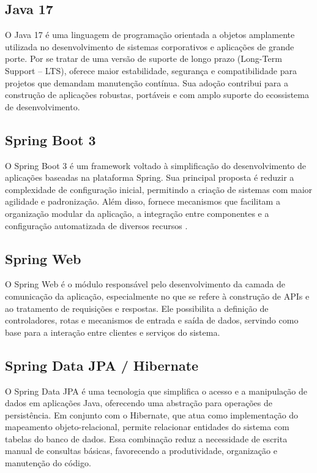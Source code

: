 \subsection{Java 17}
O Java 17 é uma linguagem de programação orientada a objetos amplamente utilizada no desenvolvimento de sistemas corporativos e aplicações de grande porte. Por se tratar de uma versão de suporte de longo prazo (Long-Term Support – LTS), oferece maior estabilidade, segurança e compatibilidade para projetos que demandam manutenção contínua. Sua adoção contribui para a construção de aplicações robustas, portáveis e com amplo suporte do ecossistema de desenvolvimento.

\subsection{Spring Boot 3}
O Spring Boot 3 é um framework voltado à simplificação do desenvolvimento de aplicações baseadas na plataforma Spring. Sua principal proposta é reduzir a complexidade de configuração inicial, permitindo a criação de sistemas com maior agilidade e padronização. Além disso, fornece mecanismos que facilitam a organização modular da aplicação, a integração entre componentes e a configuração automatizada de diversos recursos \cite{springboot2026}.

\subsection{Spring Web}
O Spring Web é o módulo responsável pelo desenvolvimento da camada de comunicação da aplicação, especialmente no que se refere à construção de APIs e ao tratamento de requisições e respostas. Ele possibilita a definição de controladores, rotas e mecanismos de entrada e saída de dados, servindo como base para a interação entre clientes e serviços do sistema.

\subsection{Spring Data JPA / Hibernate}
O Spring Data JPA é uma tecnologia que simplifica o acesso e a manipulação de dados em aplicações Java, oferecendo uma abstração para operações de persistência. Em conjunto com o Hibernate, que atua como implementação do mapeamento objeto-relacional, permite relacionar entidades do sistema com tabelas do banco de dados. Essa combinação reduz a necessidade de escrita manual de consultas básicas, favorecendo a produtividade, organização e manutenção do código.

